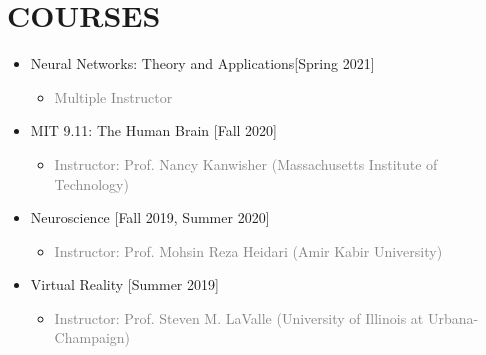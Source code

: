 \documentclass[10pt,a4paper,sans]{moderncv} %
\begin{document}
    \vspace{2.5em}

    \newpage

	\section{COURSES}
    \vspace{0.3em}
		\begin{itemize}
            \item {} Neural Networks: Theory and Applications\hfill[Spring 2021]
            \begin{itemize}
				\item \textcolor{gray}{Multiple Instructor}
			\end{itemize}


            \item {} MIT 9.11: The Human Brain \hfill[Fall 2020]
			\begin{itemize}
				\item \textcolor{gray}{Instructor: Prof. Nancy Kanwisher (Massachusetts Institute of Technology)}
			\end{itemize}

            \item {} Neuroscience \hfill[Fall 2019, Summer 2020]
			\begin{itemize}
				\item \textcolor{gray}{Instructor: Prof. Mohsin Reza Heidari (Amir Kabir University)}
			\end{itemize}

            \item {} Virtual Reality \hfill[Summer 2019]
			\begin{itemize}
				\item \textcolor{gray}{Instructor: Prof. Steven M. LaValle (University of Illinois at Urbana-Champaign)}
			\end{itemize}


\end{itemize}
\end{document}
